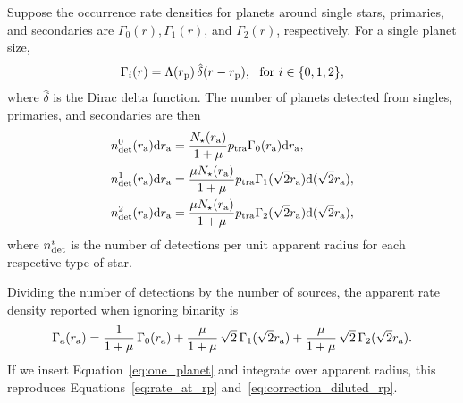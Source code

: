 \documentclass[12pt,modern]{aastex61}
\renewcommand{\a}{_{\rm a}}
\newcommand{\p}{_{\rm p}}
\begin{document}
Suppose the occurrence rate densities for planets around
single stars, primaries, and secondaries are $\Gamma_0(r),
\Gamma_1(r)$, and $\Gamma_2(r)$, respectively. For a single planet
size,
\begin{equation}
    \Gamma_i(r) = \Lambda(r\p) \, \hat{\delta}(r-r\p),~~{\rm for}
    \ i\in\{0,1,2\},
    \label{eq:one_planet}
\end{equation} 
where $\hat{\delta}$ is the Dirac delta function.
The number of planets detected from singles, primaries, and
secondaries are then
\begin{align}
  n_{\rm det}^0(r\a)\mathrm{d}r\a &= 
      \frac{N_\star(r\a)}{1+\mu} p_{\rm tra}
      \Gamma_0(r\a)\mathrm{d}r\a,
  \label{eq:n0} \\
  n_{\rm det}^1(r\a)\mathrm{d}r\a &= 
      \frac{\mu N_\star(r\a)}{1+\mu} p_{\rm tra}
      \Gamma_1(\sqrt{2}r\a)\mathrm{d}(\sqrt{2}r\a),
	\label{eq:n1} \\
  n_{\rm det}^2(r\a)\mathrm{d}r\a &=
      \frac{\mu N_\star(r\a)}{1+\mu} p_{\rm tra}
      \Gamma_2(\sqrt{2}r\a)\mathrm{d}(\sqrt{2}r\a),
	\label{eq:n2}
\end{align}
where $n_{\rm det}^i$ is the number of detections per unit apparent
radius for each respective type of star.

Dividing the number of detections by the number of sources,
the apparent rate density reported when ignoring binarity is
\begin{equation}
  \Gamma\a(r\a) =
    \frac{1}{1+\mu}\,\Gamma_0(r\a) +
    \frac{\mu}{1+\mu}\,\sqrt{2}\,\Gamma_1(\sqrt{2}r\a) +
    \frac{\mu}{1+\mu}\,\sqrt{2}\,\Gamma_2(\sqrt{2}r\a).
	\label{eq:formula_twin_binary}
\end{equation}
If we insert Equation~\ref{eq:one_planet} and integrate over
apparent radius, this reproduces Equations~\ref{eq:rate_at_rp}
and~\ref{eq:correction_diluted_rp}.

\end{document}
